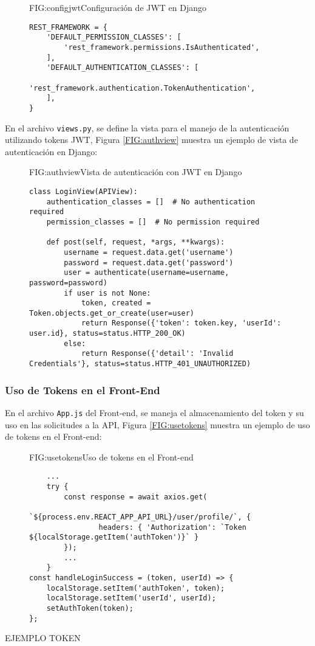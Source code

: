 \begin{figure}[Configuración JWT]{FIG:configjwt}{Configuración de JWT en Django}
\begin{verbatim}
REST_FRAMEWORK = {
    'DEFAULT_PERMISSION_CLASSES': [
        'rest_framework.permissions.IsAuthenticated',
    ],
    'DEFAULT_AUTHENTICATION_CLASSES': [
        'rest_framework.authentication.TokenAuthentication',
    ],
}
\end{verbatim}
\end{figure}

En el archivo \texttt{views.py}, se define la vista para el manejo de la autenticación utilizando tokens JWT, Figura \ref{FIG:authview} muestra un ejemplo de vista de autenticación en Django:

\begin{figure}[Vista Autenticación]{FIG:authview}{Vista de autenticación con JWT en Django}
\begin{verbatim}
class LoginView(APIView):
    authentication_classes = []  # No authentication required
    permission_classes = []  # No permission required

    def post(self, request, *args, **kwargs):
        username = request.data.get('username')
        password = request.data.get('password')
        user = authenticate(username=username, password=password)
        if user is not None:
            token, created = Token.objects.get_or_create(user=user)
            return Response({'token': token.key, 'userId': user.id}, status=status.HTTP_200_OK)
        else:
            return Response({'detail': 'Invalid Credentials'}, status=status.HTTP_401_UNAUTHORIZED)
\end{verbatim}
\end{figure}

\subsubsection{Uso de Tokens en el Front-End}

En el archivo \texttt{App.js} del Front-end, se maneja el almacenamiento del token y su uso en las solicitudes a la API, Figura \ref{FIG:usetokens} muestra un ejemplo de uso de tokens en el Front-end:

\begin{figure}[Uso de Tokens]{FIG:usetokens}{Uso de tokens en el Front-end}
\begin{verbatim}
    ...
    try {
        const response = await axios.get(
            `${process.env.REACT_APP_API_URL}/user/profile/`, {
                headers: { 'Authorization': `Token ${localStorage.getItem('authToken')}` }
        });
        ...
    }
const handleLoginSuccess = (token, userId) => {
    localStorage.setItem('authToken', token);
    localStorage.setItem('userId', userId);
    setAuthToken(token);
};
\end{verbatim}
\end{figure}

EJEMPLO TOKEN